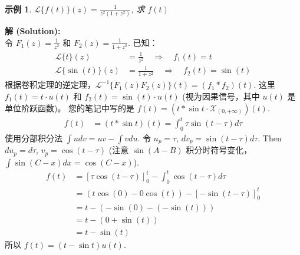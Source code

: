 \documentclass[linespread=1.5,openany]{book}%
\def\diff{d}%
\theoremstyle{plain}
\newtheorem{example}[theorem]{示例}
\newcommand{\diff}{\mathop{}\!\mathrm{d}}  %
\begin{document}
{{{{{{								\begin{example}$\mathcal{L}\{f(t)\}(z) = \frac{1}{z^2(1+z^2)}$, 求 $f(t)$ \label{ex:L15_conv_thm_inv1}
								\end{example}
								\noindent\textbf{解 (Solution):} \\
								令 $F_1(z) = \frac{1}{z^2}$ 和 $F_2(z) = \frac{1}{1+z^2}$.
								已知：
								\begin{align*}
									\mathcal{L}\{t\}(z) &= \frac{1}{z^2} \quad \Rightarrow \quad f_1(t) = t \\
									\mathcal{L}\{\sin(t)\}(z) &= \frac{1}{1+z^2} \quad \Rightarrow \quad f_2(t) = \sin(t)
								\end{align*}
								根据卷积定理的逆定理，$\mathcal{L}^{-1}\{F_1(z)F_2(z)\}(t) = (f_1*f_2)(t)$.
								这里 $f_1(t) = t \cdot u(t)$ 和 $f_2(t) = \sin(t) \cdot u(t)$ (视为因果信号，其中 $u(t)$ 是单位阶跃函数)。
								您的笔记中写的是 $f(t) = (t * \sin t \cdot \mathcal{X}_{(0,+\infty)})(t)$.
								\begin{align*}
									f(t) &= (t * \sin t)(t) = \int_{0}^{t} \tau \sin(t-\tau) \diff \tau
								\end{align*}
								使用分部积分法 $\int u \diff v = uv - \int v \diff u$.
								令 $u_p = \tau$, $\diff v_p = \sin(t-\tau)\diff \tau$.
								Then $\diff u_p = \diff \tau$, $v_p = \cos(t-\tau)$ (注意 $\sin(A-B)$ 积分时符号变化，$\int \sin(C-x)dx = \cos(C-x)$).
								\begin{align*}
									f(t) &= \left[ \tau \cos(t-\tau) \right]_{0}^{t} - \int_{0}^{t} \cos(t-\tau) \diff \tau \\
									&= (t\cos(0) - 0\cos(t)) - \left[ -\sin(t-\tau) \right]_{0}^{t} \\
									&= t - (-\sin(0) - (-\sin(t))) \\
									&= t - (0 + \sin(t)) \\
									&= t - \sin(t)
								\end{align*}
								所以 $f(t) = (t-\sin t)u(t)$.
								\vspace{\baselineskip}
								
}}}}}}
\end{document}

